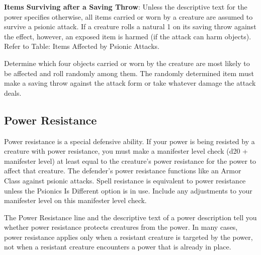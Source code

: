 \textbf{Items Surviving after a Saving Throw}: Unless the descriptive text for the power specifies otherwise, all items carried or worn by a creature are assumed to survive a psionic attack. If a creature rolls a natural 1 on its saving throw against the effect, however, an exposed item is harmed (if the attack can harm objects). Refer to Table: Items Affected by Psionic Attacks.

Determine which four objects carried or worn by the creature are most likely to be affected and roll randomly among them. The randomly determined item must make a saving throw against the attack form or take whatever damage the attack deals.


\subsection{Power Resistance}
Power resistance is a special defensive ability. If your power is being resisted by a creature with power resistance, you must make a manifester level check (d20 + manifester level) at least equal to the creature's power resistance for the power to affect that creature. The defender's power resistance functions like an Armor Class against psionic attacks. Spell resistance is equivalent to power resistance unless the Psionics Is Different option is in use. Include any adjustments to your manifester level on this manifester level check.

The Power Resistance line and the descriptive text of a power description tell you whether power resistance protects creatures from the power. In many cases, power resistance applies only when a resistant creature is targeted by the power, not when a resistant creature encounters a power that is already in place.


